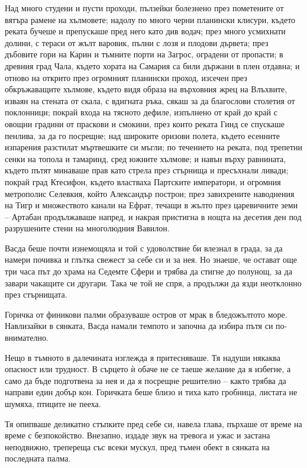 Над много студени и пусти проходи, пълзейки болезнено през пометените от вятъра
рамене на хълмовете; надолу по много черни планински клисури, където реката
бучеше и препускаше пред него като див водач; през много усмихнати долини, с
тераси от жълт варовик, пълни с лозя и плодови дървета; през дъбовите гори на
Карин и тъмните порти на Загрос, оградени от пропасти; в древния град Чала,
където хората на Самария са били държани в плен отдавна; и отново на открито
през огромният планински проход, изсечен през обкръжаващите хълмове, където видя
образа на върховния жрец на Влъхвите, изваян на стената от скала, с вдигната
ръка, сякаш за да благослови столетия от поклонници; покрай входа на тясното
дефиле, изпълнено от край до край с овощни градини от праскови и смокини, през
които реката Гинд се спускаше пенлива, за да го посрещне; над широките оризови
полета, където есенните изпарения разстилат мъртвешките си мъгли; по течението
на реката, под трепетни сенки на топола и тамаринд, сред южните хълмове; и навън
върху равнината, където пътят минаваше прав като стрела през стърнища и
пресъхнали ливади; покрай град Ктесифон, където властваха Партските императори,
и огромния метрополис Селевкия, който Александър построи; през завихрените
наводнения на Тигр и множеството канали на Ефрат, течащи в жълто през
царевичните земи -- Артабан продължаваше напред, и накрая пристигна в нощта на
десетия ден под разрушените стени на многолюдния Вавилон.

Васда беше почти изнемощяла и той с удоволствие би влезнал в града, за да намери
почивка и глътка свежест за себе си и за нея. Но знаеше, че остават още три часа
път до храма на Седемте Сфери и трябва да стигне до полунощ, за да завари
чакащите си другари. Така че той не спря, а продължи да язди неотклонно през
стърнищата.

Горичка от финикови палми образуваше остров от мрак в бледожълтото море.
Навлизайки в сянката, Васда намали темпото и започна да избира пътя си
по-внимателно.

Нещо в тъмното в далечината изглежда я притесняваше. Тя надуши някаква опасност
или трудност. В сърцето ѝ обаче не се таеше желание да я избегне, а само да бъде
подготвена за нея и да я посрещне решително -- както трябва да направи един
добър кон. Горичката беше близо и тиха като гробница, листата не шумяха, птиците
не пееха.

Тя опипваше деликатно стъпките пред себе си, навела глава, пърхаше от време на
време с безпокойство. Внезапно, издаде звук на тревога и ужас и застана
неподвижно, трепереща със всеки мускул, пред тъмен обект в сянката на последната
палма.

